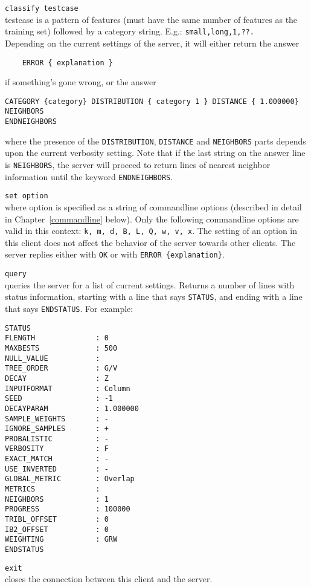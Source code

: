 \documentclass{report}
\begin{document}
\begin{description}
\item {\tt classify testcase}\\
      testcase is a pattern of features (must have the same number of
      features as the training set) followed by a category
      string. E.g.: {\tt small,long,1,??.}\\
      Depending on the current settings of the server, it will either
      return the answer 
      \begin{verbatim}
	ERROR { explanation }
      \end{verbatim}
      if something's gone wrong, or the answer
      \begin{verbatim}
CATEGORY {category} DISTRIBUTION { category 1 } DISTANCE { 1.000000} NEIGHBORS
ENDNEIGHBORS
      \end{verbatim}
      where the presence of the {\tt DISTRIBUTION}, {\tt DISTANCE} and {\tt NEIGHBORS}
parts depends upon the current verbosity setting. Note that if the
last string on the answer line is {\tt NEIGHBORS}, the server will
proceed to return lines of nearest neighbor information until the
keyword {\tt ENDNEIGHBORS}.
\item {\tt set option}\\ where option is specified as a string of
      commandline options (described in detail in
      Chapter~\ref{commandline} below). Only the following commandline
      options are valid in this context: {\tt k, m, d, B, L, Q, w, v,
      x}. The setting of an option in this client does not affect the
      behavior of the server towards other clients. The server replies
      either with {\tt OK} or with {\tt ERROR \{explanation\}}.
\item {\tt query}\\
      queries the server for a list of current settings. Returns a
number of lines with status information, starting with a line that
says {\tt STATUS}, and ending with a line that says {\tt ENDSTATUS}. For example:

\begin{footnotesize}
\begin{verbatim}
STATUS
FLENGTH              : 0
MAXBESTS             : 500
NULL_VALUE           : 
TREE_ORDER           : G/V
DECAY                : Z
INPUTFORMAT          : Column
SEED                 : -1
DECAYPARAM           : 1.000000
SAMPLE_WEIGHTS       : -
IGNORE_SAMPLES       : +
PROBALISTIC          : -
VERBOSITY            : F
EXACT_MATCH          : -
USE_INVERTED         : -
GLOBAL_METRIC        : Overlap
METRICS              : 
NEIGHBORS            : 1
PROGRESS             : 100000
TRIBL_OFFSET         : 0
IB2_OFFSET           : 0
WEIGHTING            : GRW
ENDSTATUS
\end{verbatim}
\end{footnotesize}

\item {\tt exit}\\
      closes the connection between this client and the server.
\end{description}

\clearpage



\end{document}
